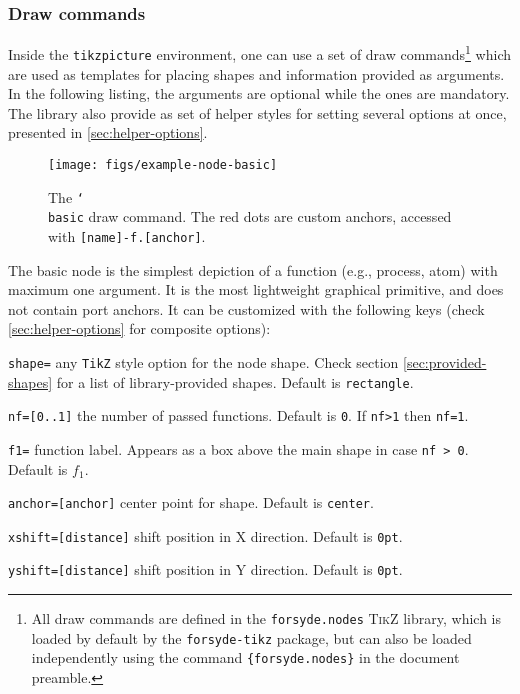 \subsubsection{Draw commands}
\label{sec:draw-commands}

Inside the \texttt{tikzpicture} environment, one can use a set of draw commands\footnote{All draw commands are defined in the \texttt{forsyde.nodes} \textsc{TikZ} library, which is loaded by default by the \texttt{forsyde-tikz} package, but can also be loaded independently using the command \texttt{\string\usetikzlibrary\{forsyde.nodes\}} in the document preamble.} which are used as templates for placing shapes and information provided as arguments. In the following listing, the \man{} arguments are optional while the  ones are mandatory. 
The library also provide as set of helper styles for setting several options at once, presented in \ref{sec:helper-options}.


\begin{figure}[htb]\centering
\texttt{[image: figs/example-node-basic]}

\caption{The \texttt{\char`\\basic} draw command. The red dots are custom anchors, accessed with \texttt{[name]-f.[anchor]}.}
\end{figure}
\hspace{1pt}

\noindent The basic node is the simplest depiction of a function (e.g., process, atom) with maximum one argument. It is the most lightweight graphical primitive, and does not contain port anchors. It can be customized with the following keys (check \ref{sec:helper-options} for composite options):

\begin{optionslist}
\item \texttt{shape=} any \texttt{TikZ} style option for the node shape. Check section \ref{sec:provided-shapes} for a list of library-provided shapes. Default is \texttt{rectangle}.
\item \texttt{nf=[0..1]} the number of passed functions. Default is \texttt{0}. If \texttt{nf>1} then \texttt{nf=1}.
\item \texttt{f1=} function label. Appears as a box above the main shape in case \texttt{nf > 0}. Default is $f_1$.
\item \texttt{anchor=[anchor]} center point for shape. Default is \texttt{center}.
\item \texttt{xshift=[distance]} shift position in X direction. Default is \texttt{0pt}.
\item \texttt{yshift=[distance]} shift position in Y direction. Default is \texttt{0pt}.
\end{optionslist}



